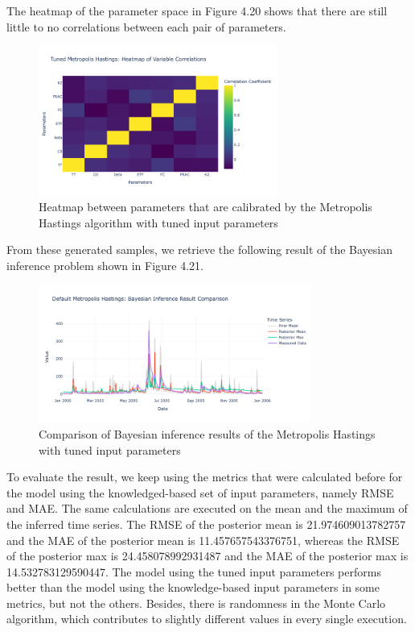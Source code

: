 The heatmap of the parameter space in Figure 4.20 shows that there are still little to no correlations between each pair of parameters.
\begin{figure}[H]
    \centering
    \includegraphics[width=0.7\textwidth]{figures/basic_mh/tuned_mh/tuned_mh_heatmap.png}
    \captionsetup{width=.8\textwidth}
    \caption{Heatmap between parameters that are calibrated by the Metropolis Hastings algorithm with tuned input parameters}
    \label{fig:enter-label}
\end{figure}

From these generated samples, we retrieve the following result of the Bayesian inference problem shown in Figure 4.21.

\begin{figure}[H]
    \centering
    \includegraphics[width=0.8\textwidth] {figures/basic_mh/tuned_mh/tuned_mh_bayes.png}
    \captionsetup{width=.8\textwidth}
    \caption{Comparison of Bayesian inference results of the Metropolis Hastings with tuned input parameters}
    \label{fig:enter-label}
\end{figure}

To evaluate the result, we keep using the metrics that were calculated before for the model using the knowledged-based set of input parameters, namely RMSE and MAE. The same calculations are executed on the mean and the maximum of the inferred time series. The RMSE of the posterior mean is 21.974609013782757 and the MAE of the posterior mean is 11.457657543376751, whereas the RMSE of the posterior max is 24.458078992931487 and the MAE of the posterior max is 14.532783129590447. The model using the tuned input parameters performs better than the model using the knowledge-based input parameters in some metrics, but not the others. Besides, there is randomness in the Monte Carlo algorithm,\cite{monte_carlo_randomness} which contributes to slightly different values in every single execution.


